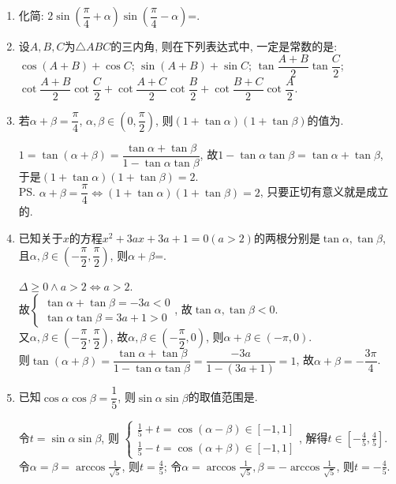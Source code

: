 \begin{enumerate}
\item 化简: $2\sin\left(\dfrac{\pi}{4}+\alpha\right)\sin\left(\dfrac{\pi}{4}-\alpha\right)$=. 

\item 设$A,B,C$为$\triangle{ABC}$的三内角, 则在下列表达式中, 一定是常数的是: \\
 $\cos(A+B)+\cos{C}$;
 $\sin(A+B)+\sin{C}$;
 $\tan\dfrac{A+B}{2}\tan\dfrac{C}{2}$;
 $\cot\dfrac{A+B}{2}\cot\dfrac{C}{2}+\cot\dfrac{A+C}{2}\cot\dfrac{B}{2}+\cot\dfrac{B+C}{2}\cot\dfrac{A}{2}$. 

\item 若$\alpha+\beta=\dfrac{\pi}{4}$, $\alpha,\beta\in\left(0,\dfrac{\pi}{2}\right)$, 
则$(1+\tan\alpha)(1+\tan\beta)$的值为. 
\begin{jieda}
$1=\tan(\alpha+\beta)=\dfrac{\tan\alpha+\tan\beta}{1-\tan\alpha\tan\beta}$, 故$1-\tan\alpha\tan\beta=\tan\alpha+\tan\beta$, \\
于是$(1+\tan\alpha)(1+\tan\beta)=2$. \\
\ps $\alpha+\beta=\dfrac{\pi}{4}\iff (1+\tan\alpha)(1+\tan\beta)=2$, 只要正切有意义就是成立的. 
\end{jieda}


\item 已知关于$x$的方程$x^2+3ax+3a+1=0(a>2)$的两根分别是$\tan\alpha,\tan\beta$, 且$\alpha,\beta\in\left(-\dfrac{\pi}{2},\dfrac{\pi}{2}\right)$, 
则$\alpha+\beta$=. 
\begin{jieda}
$\Delta\geq 0\land a>2\iff a>2$. \\
故$\begin{cases}
\tan\alpha+\tan\beta=-3a<0\\
\tan\alpha\tan\beta=3a+1>0
\end{cases}$, 
故$\tan\alpha,\tan\beta<0$. \\
又$\alpha,\beta\in\left(-\dfrac{\pi}{2},\dfrac{\pi}{2}\right)$, 故$\alpha,\beta\in\left(-\dfrac{\pi}{2},0\right)$, 则$\alpha+\beta\in(-\pi,0)$. \\
则$\tan(\alpha+\beta)=\dfrac{\tan\alpha+\tan\beta}{1-\tan\alpha\tan\beta}=\dfrac{-3a}{1-(3a+1)}=1$, 故$\alpha+\beta=-\dfrac{3\pi}{4}$. 
\end{jieda}


\item 已知$\cos\alpha\cos\beta=\dfrac{1}{5}$, 则$\sin\alpha\sin\beta$的取值范围是. 
\begin{jieda}
令$t=\sin\alpha\sin\beta$, 则
$\begin{cases}
\frac{1}{5}+t=\cos(\alpha-\beta)\in[-1,1]\\
\frac{1}{5}-t=\cos(\alpha+\beta)\in[-1,1]
\end{cases}$, 
解得$t\in[-\frac{4}{5},\frac{4}{5}]$. \\
令$\alpha=\beta=\arccos\frac{1}{\sqrt{5}}$, 则$t=\frac{4}{5}$; 令$\alpha=\arccos\frac{1}{\sqrt{5}},\beta=-\arccos\frac{1}{\sqrt{5}}$, 则$t=-\frac{4}{5}$. 
\end{jieda}


\end{enumerate}
